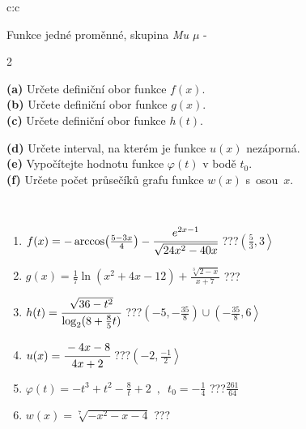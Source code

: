 \documentclass[10pt]{report}
\begin{document}
\begin{tabular}{c:c}
\begin{minipage}[c][104.5mm][t]{0.5\linewidth}
\begin{center}
\vspace{7mm}
{\huge Funkce jedné proměnné, skupina \textit{Mu $\mu$} -}\\[5mm]
\begin{minipage}{0.95\linewidth}
\begin{center}
{\small \begin{multicols}{2} \raggedright
\textbf{(a)} Určete definiční obor funkce \(f(x)\). \\[1mm]
\textbf{(b)} Určete definiční obor funkce \(g(x)\). \\[1mm]
\textbf{(c)} Určete definiční obor funkce \(h(t)\). \par \columnbreak
\textbf{(d)} Určete interval, na kterém je funkce \(u(x)\) nezáporná. \\[1mm]
\textbf{(e)} Vypočítejte hodnotu funkce \(\varphi(t)\) v bodě \(t_0\). \\[1mm]
\textbf{(f)} Určete počet průsečíků grafu funkce \(w(x)\) s~osou~\(x\). \\[1mm]
\end{multicols}
}
\end{center}
\end{minipage}
\\[4mm]
\begin{minipage}{0.79\linewidth}
\begin{center}
\begin{varwidth}{\linewidth}
\begin{enumerate}
\small
\item $f(x) = -\arccos\!\left( \frac{5-3x}{4} \right) - \cfrac{e^{2x-1}}{\sqrt{24x^2-40x}}$\quad \dotfill\; ???\;\dotfill \quad $\left(\frac{5}{3} , 3\right\rangle$
\item $g(x) = \frac{1}{7} \ln{\!(x^2+4x-12)}+\frac{\sqrt[3]{2-x}}{x+7}$\quad \dotfill\; ???\;\dotfill {}
\item $h(t) = \cfrac{\sqrt{36-t^2}}{\log_2(8+\frac{8}{5}t)}$\quad \dotfill\; ???\;\dotfill \quad $\left(-5 , -\frac{35}{8}\right)\cup\left(-\frac{35}{8} , 6\right\rangle$
\item $u(x) = \cfrac{-4x-8}{4x+2}$\quad \dotfill\; ???\;\dotfill \quad $\left(-2 , \frac{-1}{2}\right\rangle$
\item $\varphi(t) = -t^3+t^2-\frac{8}{t}+2 \enspace , \enspace t_0=-\frac{1}{4}$\quad \dotfill\; ???\;\dotfill \quad $\frac{261}{64}$
\item $w(x) = \sqrt[7]{-x^2-x-4}$\quad \dotfill\; ???\;\dotfill {}

\end{enumerate}
\end{varwidth}
\end{center}
\end{minipage}
\end{center}
\end{minipage}
\end{tabular}
\end{document}
